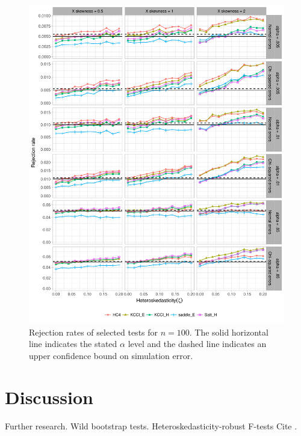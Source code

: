 \documentclass[12pt]{article}\usepackage[]{graphicx}\usepackage[]{color}
\newenvironment{knitrout}{}{} %
\begin{document}
\begin{knitrout}
\color{fgcolor}\begin{figure}[p]

{\centering \includegraphics[width=\linewidth]{HC_fig/selected_size_100-1} 

}

\caption[Rejection rates of selected tests for $n = 100$]{Rejection rates of selected tests for $n = 100$. The solid horizontal line indicates the stated $\alpha$ level and the dashed line indicates an upper confidence bound on simulation error.}\label{fig:selected_size_100}
\end{figure}


\end{knitrout}

\section{Discussion}
\label{sec:conc}

Further research. 
Wild bootstrap tests.
Heteroskedasticity-robust F-tests Cite \citet{Cai2008new}.



\end{document}
